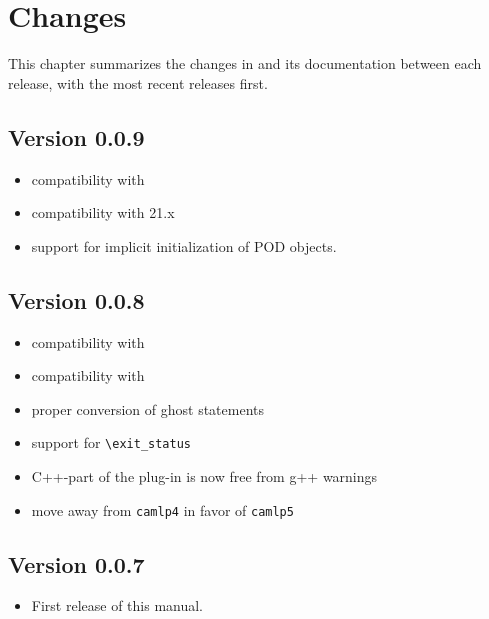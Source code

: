 \chapter{Changes}\label{chap:changes}

This chapter summarizes the changes in \fclang and its documentation
between each release, with the most recent releases first.

\section*{Version 0.0.9}
\begin{itemize}
\item compatibility with 
\item compatibility with \framac 21.x
\item support for implicit initialization of POD objects.
\end{itemize}

\section*{Version 0.0.8}
\begin{itemize}
\item compatibility with 
\item compatibility with 
\item proper conversion of ghost statements
\item support for \acslpp \lstinline|\exit_status|
\item C++-part of the plug-in is now free from g++ warnings
\item move away from \lstinline|camlp4| in favor of \lstinline|camlp5|
\end{itemize}

\section*{Version 0.0.7}
\begin{itemize}
\item First release of this manual.
\end{itemize}
